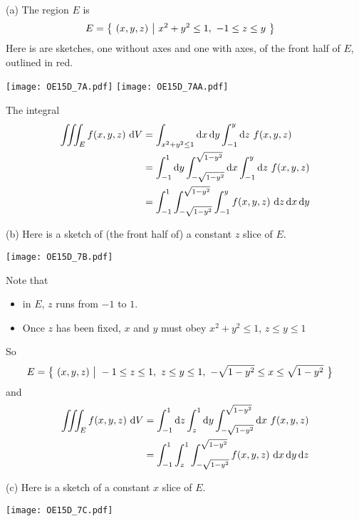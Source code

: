 \begin{solution}
(a)
The region $E$ is
\begin{align*}
E &= \big\{ \ (x,y,z)\ \big|\ x^2+y^2\le 1,\ -1\le z\le y\ \big\} 
\end{align*}
Here is are sketches, one without axes and one with axes, 
of the front half of $E$, outlined in red.

\begin{center}
\texttt{[image: OE15D\_7A.pdf]}\quad
\texttt{[image: OE15D\_7AA.pdf]}
\end{center}

The integral
\begin{align*}
\iiint_E f(x,y,z)\ \mathrm{d}V
&=\int_{x^2+y^2\le 1}\mathrm{d}x\,\mathrm{d}y\int_{-1}^y\mathrm{d}z\ f(x,y,z) \\
&=\int_{-1}^1\mathrm{d}y\int_{-\sqrt{1-y^2}}^{\sqrt{1-y^2}}\mathrm{d}x
        \int_{-1}^y\mathrm{d}z\ f(x,y,z) \\
&=\int_{-1}^1\int_{-\sqrt{1-y^2}}^{\sqrt{1-y^2}}
        \int_{-1}^y f(x,y,z)\ \mathrm{d}z\,\mathrm{d}x\,\mathrm{d}y 
\end{align*}



(b)
Here is a sketch of (the front half of) a constant $z$  slice of $E$.

\begin{center}
\texttt{[image: OE15D\_7B.pdf]}
\end{center}

Note that
\begin{itemize}
\item
  in $E$, $z$ runs from $-1$ to $1$.
\item 
  Once $z$ has been fixed, $x$ and $y$ must obey $x^2+y^2\le 1$,
     $z\le y\le 1$
\end{itemize}
So 
\begin{align*}
E &= \Set{(x,y,z)}{-1\le z\le 1,\ z\le y\le 1,\ 
            -\sqrt{1-y^2}\le x\le\sqrt{1-y^2}} 
\end{align*}
and 
\begin{align*}
\iiint_E f(x,y,z)\ \mathrm{d}V
&=\int_{-1}^1\mathrm{d}z\int_z^1\mathrm{d}y
         \int_{-\sqrt{1-y^2}}^{\sqrt{1-y^2}}\mathrm{d}x\ f(x,y,z) \\
&=\int_{-1}^1\int_z^1 \int_{-\sqrt{1-y^2}}^{\sqrt{1-y^2}}
              f(x,y,z)\ \mathrm{d}x\,\mathrm{d}y\,\mathrm{d}z 
\end{align*}


(c)
Here is a sketch of a constant $x$  slice of $E$.

\begin{center}
\texttt{[image: OE15D\_7C.pdf]}
\end{center}


\end{solution}
